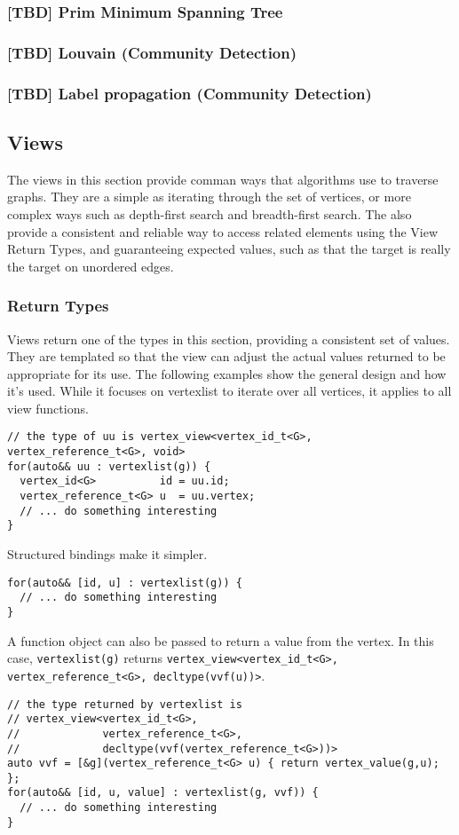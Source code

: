 \documentclass[10pt,onecolumn]{article}
\newcommand{\tcode}[1]{\lstinline[breaklines=true]{#1}}
\begin{document}
\subsubsection{[TBD] Prim Minimum Spanning Tree}
\subsubsection{[TBD] Louvain (Community Detection)}
\subsubsection{[TBD] Label propagation (Community Detection)}

\subsection{Views}
The views in this section provide comman ways that algorithms use to traverse graphs. They are a simple as iterating through the set of vertices, or more complex ways such as depth-first search and breadth-first search. The also provide a consistent and reliable way to access related elements using the View Return Types, and guaranteeing expected values, such as that the target is really the target on unordered edges.

\subsubsection{Return Types}
Views return one of the types in this section, providing a consistent set of values. They are templated so that the view can adjust the actual values returned to be appropriate for its use. The following examples show the general design and how it's used. While it focuses on vertexlist to iterate over all vertices, it applies to all view functions.

\begin{lstlisting}
// the type of uu is vertex_view<vertex_id_t<G>, vertex_reference_t<G>, void>
for(auto&& uu : vertexlist(g)) {
  vertex_id<G>          id = uu.id;
  vertex_reference_t<G> u  = uu.vertex;
  // ... do something interesting
}
\end{lstlisting}

Structured bindings make it simpler.
\begin{lstlisting}
for(auto&& [id, u] : vertexlist(g)) {
  // ... do something interesting
}
\end{lstlisting}

A function object can also be passed to return a value from the vertex. In this case, \tcode{vertexlist(g)} returns \tcode{vertex_view<vertex_id_t<G>, vertex_reference_t<G>, decltype(vvf(u))>}.
\begin{lstlisting}
// the type returned by vertexlist is 
// vertex_view<vertex_id_t<G>, 
//             vertex_reference_t<G>, 
//             decltype(vvf(vertex_reference_t<G>))>
auto vvf = [&g](vertex_reference_t<G> u) { return vertex_value(g,u); };
for(auto&& [id, u, value] : vertexlist(g, vvf)) {
  // ... do something interesting
}
\end{lstlisting}
\end{document}
